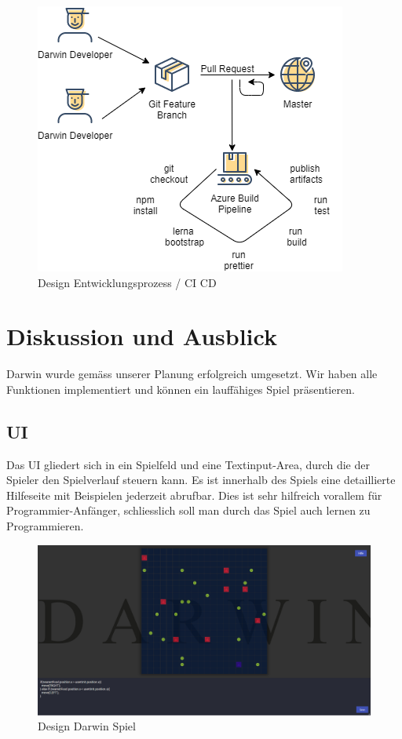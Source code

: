 \documentclass[11pt,a4paper,titlepage]{article}
\begin{document}
\begin{figure}[H]
	\includegraphics{workflow.png}
	\caption{Design Entwicklungsprozess / CI CD}
\end{figure}

\newpage

\section{Diskussion und Ausblick}
%

Darwin wurde gemäss unserer Planung erfolgreich umgesetzt. Wir haben alle Funktionen implementiert und können ein lauffähiges Spiel präsentieren.

\subsection{UI}

Das UI gliedert sich in ein Spielfeld und eine Textinput-Area, durch die der Spieler den Spielverlauf steuern kann. Es ist innerhalb des Spiels eine detaillierte Hilfeseite mit Beispielen jederzeit abrufbar. Dies ist sehr hilfreich vorallem für Programmier-Anfänger, schliesslich soll man durch das Spiel auch lernen zu Programmieren.

\begin{figure}[H]
\includegraphics[width=\textwidth]{darwin-gameplay.png}
	\caption{Design Darwin Spiel}
\end{figure}
\end{document}
